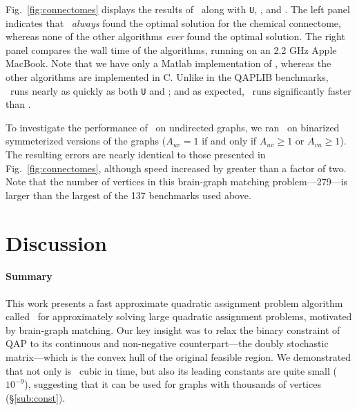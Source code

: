\documentclass{article} %
\begin{document}
Fig.\ \ref{fig:connectomes} displays the results of \FAQ\  along with \texttt{U}, \Qcv,  and \Path.  The left panel indicates that \FAQ\  \emph{always} found the optimal solution for the chemical connectome, whereas none of the other algorithms \emph{ever} found the optimal solution.  The right panel compares the wall time of the algorithms, running on an 2.2 GHz Apple MacBook. Note that we have only a Matlab implementation of \FAQ, whereas the other algorithms are implemented in C.  Unlike in the QAPLIB benchmarks, \FAQ\  runs nearly as quickly as both \texttt{U} and \Qcv; and as expected, \FAQ\  runs significantly faster than \Path.  



To investigate the performance of \FAQ\  on undirected graphs, we ran \FAQ\  on binarized symmeterized versions of the graphs ($A_{uv}=1$ if and only if $A_{uv}\geq 1$ or $A_{vu} \geq 1$).  The resulting errors are nearly identical to those presented in Fig.\ \ref{fig:connectomes}, although speed increased by greater than a factor of two. Note that the number of vertices in this brain-graph matching problem---279---is larger than the largest of the 137 benchmarks used above. 


\vspace{-5pt}
\section{Discussion}
\label{sec:discussion}

\vspace{-5pt}
\paragraph{Summary}

This work presents a fast approximate quadratic assignment problem algorithm called \FAQ\  for approximately solving large quadratic assignment problems, motivated by brain-graph matching.  Our key insight was to relax the binary constraint of QAP to its continuous and non-negative counterpart---the doubly stochastic matrix---which is the convex hull of the original feasible region.  
We demonstrated that not only is \FAQ\  cubic in time, but also its leading constants are quite small ($10^{-9}$), suggesting that it can be used for graphs with  thousands of vertices (\S \ref{sub:const}).  
\end{document}
